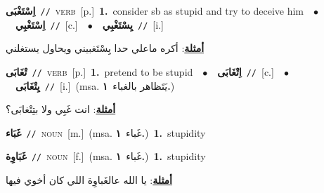 \documentclass[10pt,a4paper,twoside]{article} %
\begin{document}
\begin{multicols}{2}
{\setlength\topsep{0pt}\textbf{\foreignlanguage{arabic}{اِسْتَغْبَى}}\ {\color{gray}\texttt{//}\color{black}}\ \textsc{verb}\ [p.]\ \textbf{1.}~consider sb as stupid and try to deceive him\ \ $\bullet$\ \ \setlength\topsep{0pt}\textbf{\foreignlanguage{arabic}{اِسْتَغْبِي}}\ {\color{gray}\texttt{//}\color{black}}\ [c.]\ \ $\bullet$\ \ \setlength\topsep{0pt}\textbf{\foreignlanguage{arabic}{يِسْتَغْبِي}}\ {\color{gray}\texttt{//}\color{black}}\ [i.]\  \begin{flushright}\color{gray}\foreignlanguage{arabic}{\textbf{\underline{\foreignlanguage{arabic}{أمثلة}}}: أكره ماعلي حدا يِسْتَغبيني ويحاول يستغلني}\end{flushright}\color{black}} \vspace{2mm}

{\setlength\topsep{0pt}\textbf{\foreignlanguage{arabic}{تْغَابَى}}\ {\color{gray}\texttt{//}\color{black}}\ \textsc{verb}\ [p.]\ \textbf{1.}~pretend to be stupid\ \ $\bullet$\ \ \setlength\topsep{0pt}\textbf{\foreignlanguage{arabic}{اِتْغَابَى}}\ {\color{gray}\texttt{//}\color{black}}\ [c.]\ \ $\bullet$\ \ \setlength\topsep{0pt}\textbf{\foreignlanguage{arabic}{يِتْغَابَى}}\ {\color{gray}\texttt{//}\color{black}}\ [i.]\ \color{gray}(msa. \foreignlanguage{arabic}{يَتَظاهر بالغباء}~\foreignlanguage{arabic}{\textbf{١.}})\color{black}\  \begin{flushright}\color{gray}\foreignlanguage{arabic}{\textbf{\underline{\foreignlanguage{arabic}{أمثلة}}}: انت غَبِي ولا بتِتْغابَى؟}\end{flushright}\color{black}} \vspace{2mm}

{\setlength\topsep{0pt}\textbf{\foreignlanguage{arabic}{غَبَاء}}\ {\color{gray}\texttt{//}\color{black}}\ \textsc{noun}\ [m.]\ \color{gray}(msa. \foreignlanguage{arabic}{غَباء}~\foreignlanguage{arabic}{\textbf{١.}})\color{black}\ \textbf{1.}~stupidity\ } \vspace{2mm}

{\setlength\topsep{0pt}\textbf{\foreignlanguage{arabic}{غَبَاوِة}}\ {\color{gray}\texttt{//}\color{black}}\ \textsc{noun}\ [f.]\ \color{gray}(msa. \foreignlanguage{arabic}{غَباء}~\foreignlanguage{arabic}{\textbf{١.}})\color{black}\ \textbf{1.}~stupidity\  \begin{flushright}\color{gray}\foreignlanguage{arabic}{\textbf{\underline{\foreignlanguage{arabic}{أمثلة}}}: يا الله عالغَباوِة اللي كان أخوي فيها}\end{flushright}\color{black}} \vspace{2mm}


\end{multicols}
\end{document}
